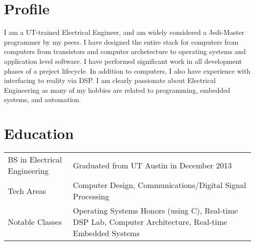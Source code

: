 \documentclass[letterpaper,12pt]{resume}
\begin{document}
\let\olditemize\itemize
\renewcommand{\itemize}{
  \olditemize
  \setlength{\itemsep}{1pt}
  \setlength{\parskip}{0pt}
  \setlength{\parsep}{0pt}
}

\author{James Brisson}
\maketitle

\section{Profile}
\noindent
I am a UT-trained Electrical Engineer, and am widely considered a Jedi-Master programmer by my peers.
I have designed the entire stack for computers from computers from transistors and computer archetecture to operating systems and application level software. 
I have performed significant work in all development phases of a preject lifecycle.
In addition to computers, I also have experience with interfacing to reality via DSP.
I am clearly passionate about Electrical Engineering as many of my hobbies are related to programming, embedded systems, and automation.

\section{Education}
\noindent
\begin{tabular}{p{}p{}}
  BS in Electrical Engineering&
  Graduated from UT Austin in December 2013\\
  \noalign{\smallskip}
  Tech Areas&
  Computer Design, Communications/Digital Signal Processing\\
  \noalign{\smallskip}
  Notable Classes&
  Operating Systems Honors (using C), Real-time DSP Lab, Computer Architecture, Real-time Embedded Systems\\
\end{tabular}
\end{document}
